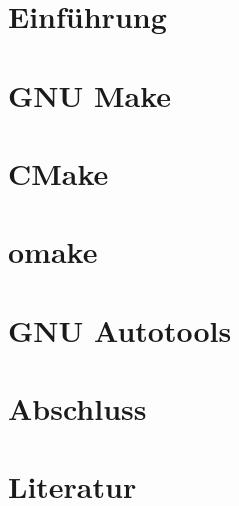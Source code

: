 \documentclass{beamer}
\begin{document}
	\renewcommand{\pause}{}

	\section{Einführung}
	
	

	\section{GNU Make}
	

	\section{CMake}
	\section{omake}
	\section{GNU Autotools}

	\section{Abschluss}
	

	\section{Literatur}
	
	
\end{document}
